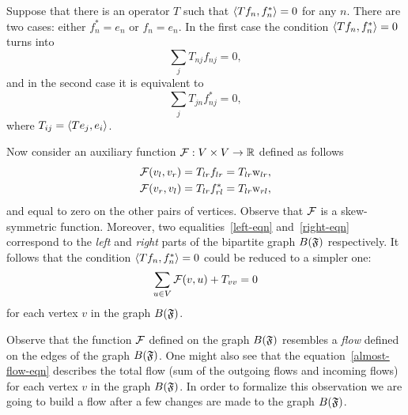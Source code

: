 \documentclass[12pt,oneside,a4paper]{amsart}
\begin{document}
      Suppose that there is an operator $T$ such that $\langle Tf_n, f_n^* \rangle = 0$ for any $n$.
      There are two cases: either $f^*_n = e_n$ or $f_n = e_n$.
      In the first case the condition $\langle Tf_n, f_n^* \rangle = 0$ turns into
      \begin{equation}
          \label{left-eqn}
          \sum_j T_{nj} f_{nj} = 0,
      \end{equation}
      and in the second case it is equivalent to
      \begin{equation}
          \label{right-eqn}
          \sum_j T_{jn} f^*_{nj} = 0,
      \end{equation}
      where $T_{ij} = \langle Te_j, e_i \rangle$.

      Now consider an auxiliary function $\mathcal{{F}}: V \times V \to \mathbb{R}$ defined as follows
      \begin{align*}
        &\mathcal{{F}}(v_l, v_r) = T_{lr} f_{lr} = T_{lr} \mathrm{w}_{lr},\\
        &\mathcal{{F}}(v_r, v_l) = T_{lr} f^*_{rl} = T_{lr} \mathrm{w}_{rl},
      \end{align*}
      and equal to zero on the other pairs of vertices.
      Observe that $\mathcal{{F}}$ is a skew-symmetric function.
      Moreover, two equalities~\eqref{left-eqn} and~\eqref{right-eqn} correspond to the \emph{left} and \emph{right}
        parts of the bipartite graph $B(\mathfrak{F})$ respectively.
      It follows that the condition $\langle Tf_n, f_n^* \rangle = 0$ could be reduced to a simpler one:
      \begin{equation}
        \label{almost-flow-eqn}
        \sum_{u \in V} \mathcal{{F}}(v, u) + T_{vv} = 0
      \end{equation}
        for each vertex $v$ in the graph $B(\mathfrak{F})$.
      \begin{remark}
        Observe that the function $\mathcal{{F}}$ defined on the graph $B(\mathfrak{F})$ resembles
          a \emph{flow} defined on the edges of the graph $B(\mathfrak{F})$.
        One might also see that the equation~\eqref{almost-flow-eqn} describes the total flow (sum of the outgoing flows and incoming flows) 
          for each vertex $v$ in the graph $B(\mathfrak{F})$.
        In order to formalize this observation we are going to build a flow
          after a few changes are made to the graph $B(\mathfrak{F})$.
      \end{remark}

    \medskip
\end{document}
